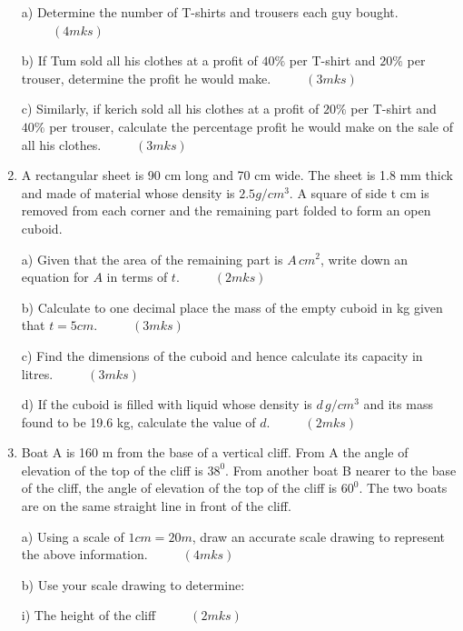 \documentclass[
  a4paperpaper,
]{scrbook}
\begin{document}
\begin{tcolorbox}
\begin{enumerate}
  a) Determine the number of T-shirts and trousers each guy bought.
  \(\hspace{1cm}(4mks)\)

  b) If Tum sold all his clothes at a profit of \(40\%\) per T-shirt and
  \(20\%\) per trouser, determine the profit he would make.
  \(\hspace{1cm}(3mks)\)

  c) Similarly, if kerich sold all his clothes at a profit of \(20\%\)
  per T-shirt and \(40\%\) per trouser, calculate the percentage profit
  he would make on the sale of all his clothes. \(\hspace{1cm} (3mks)\)
\item
  A rectangular sheet is 90 cm long and 70 cm wide. The sheet is 1.8 mm
  thick and made of material whose density is \(2.5g/cm^3\). A square of
  side t cm is removed from each corner and the remaining part folded to
  form an open cuboid.

  a) Given that the area of the remaining part is \(A \,cm^2\), write
  down an equation for \(A\) in terms of \(t\). \(\hspace{1cm} (2mks)\)

  b) Calculate to one decimal place the mass of the empty cuboid in kg
  given that \(t= 5cm\). \(\hspace{1cm} (3mks)\)

  c) Find the dimensions of the cuboid and hence calculate its capacity
  in litres. \(\hspace{1cm} (3mks)\)

  d) If the cuboid is filled with liquid whose density is \(d\, g/cm^3\)
  and its mass found to be 19.6 kg, calculate the value of \(d\).
  \(\hspace{1cm} (2mks)\)
\item
  Boat A is 160 m from the base of a vertical cliff. From A the angle of
  elevation of the top of the cliff is \(38^0\). From another boat B
  nearer to the base of the cliff, the angle of elevation of the top of
  the cliff is \(60^0\). The two boats are on the same straight line in
  front of the cliff.

  a) Using a scale of \(1 cm=20 m\), draw an accurate scale drawing to
  represent the above information. \(\hspace{1cm} (4mks)\)

  b) Use your scale drawing to determine:

  i) The height of the cliff \(\hspace{1cm} (2mks)\)


\end{enumerate}
\end{tcolorbox}
\end{document}
